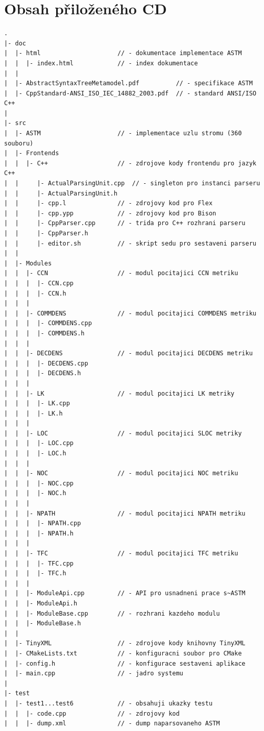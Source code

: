 \documentclass[11pt,twoside,a4paper]{book}
\begin{document}
\chapter{Obsah přiloženého CD}
\begin{verbatim}
.
|- doc
|  |- html                     // - dokumentace implementace ASTM
|  |  |- index.html            // - index dokumentace
|  |
|  |- AbstractSyntaxTreeMetamodel.pdf          // - specifikace ASTM
|  |- CppStandard-ANSI_ISO_IEC_14882_2003.pdf  // - standard ANSI/ISO C++
|
|- src
|  |- ASTM                     // - implementace uzlu stromu (360 souboru)
|  |- Frontends
|  |  |- C++                   // - zdrojove kody frontendu pro jazyk C++
|  |     |- ActualParsingUnit.cpp  // - singleton pro instanci parseru
|  |     |- ActualParsingUnit.h
|  |     |- cpp.l              // - zdrojovy kod pro Flex
|  |     |- cpp.ypp            // - zdrojovy kod pro Bison
|  |     |- CppParser.cpp      // - trida pro C++ rozhrani parseru
|  |     |- CppParser.h
|  |     |- editor.sh          // - skript sedu pro sestaveni parseru
|  |
|  |- Modules
|  |  |- CCN                   // - modul pocitajici CCN metriku
|  |  |  |- CCN.cpp
|  |  |  |- CCN.h
|  |  |
|  |  |- COMMDENS              // - modul pocitajici COMMDENS metriku
|  |  |  |- COMMDENS.cpp
|  |  |  |- COMMDENS.h
|  |  |
|  |  |- DECDENS               // - modul pocitajici DECDENS metriku
|  |  |  |- DECDENS.cpp
|  |  |  |- DECDENS.h
|  |  |
|  |  |- LK                    // - modul pocitajici LK metriky
|  |  |  |- LK.cpp
|  |  |  |- LK.h
|  |  |
|  |  |- LOC                   // - modul pocitajici SLOC metriky
|  |  |  |- LOC.cpp
|  |  |  |- LOC.h
|  |  |
|  |  |- NOC                   // - modul pocitajici NOC metriku
|  |  |  |- NOC.cpp
|  |  |  |- NOC.h
|  |  |
|  |  |- NPATH                 // - modul pocitajici NPATH metriku
|  |  |  |- NPATH.cpp
|  |  |  |- NPATH.h
|  |  |
|  |  |- TFC                   // - modul pocitajici TFC metriku
|  |  |  |- TFC.cpp
|  |  |  |- TFC.h
|  |  |
|  |  |- ModuleApi.cpp         // - API pro usnadneni prace s~ASTM
|  |  |- ModuleApi.h
|  |  |- ModuleBase.cpp        // - rozhrani kazdeho modulu
|  |  |- ModuleBase.h
|  |
|  |- TinyXML                  // - zdrojove kody knihovny TinyXML
|  |- CMakeLists.txt           // - konfiguracni soubor pro CMake
|  |- config.h                 // - konfigurace sestaveni aplikace
|  |- main.cpp                 // - jadro systemu
|
|- test
|  |- test1...test6            // - obsahuji ukazky testu
|  |  |- code.cpp              // - zdrojovy kod
|  |  |- dump.xml              // - dump naparsovaneho ASTM

\end{verbatim}
\end{document}
